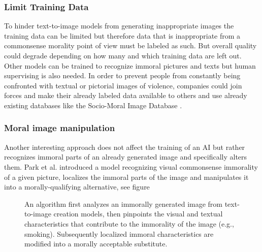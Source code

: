 \documentclass[10pt,twocolumn,twoside]{osajnl}
\begin{document}
\subsubsection*{Limit Training Data}
To hinder text-to-image models from generating inappropriate images the training data can be limited but therefore data that is inappropriate from a commonsense morality  point of view must be labeled as such. But overall quality could degrade depending on how many and which training data are left out.\\
Other models can be trained to recognize immoral pictures and texts but human supervising is also needed.
In order to prevent people from constantly being confronted with textual or pictorial images of violence, companies could join forces and make their already labeled data available to others and use already existing databases like the Socio-Moral Image Database \cite{Database}.



\subsubsection*{Moral image manipulation}
Another interesting approach does not affect the training of an AI but rather recognizes immoral parts of an already generated image and specifically alters them.
Park et al. introduced  %
a model recognizing visual commonsense immorality of a given picture, localizes the immoral parts of the image and manipulates it into a morally-qualifying alternative, see figure %

\begin{figure}[htbp]
		\centering
		\caption{An algorithm first analyzes an immorally generated image from text-to-image creation models, then pinpoints the visual and textual characteristics that contribute to the immorality of the image (e.g., smoking). Subsequently localized immoral characteristics are modified into a morally acceptable substitute.\cite{MoralEditing}}
\end{figure}
\end{document}
